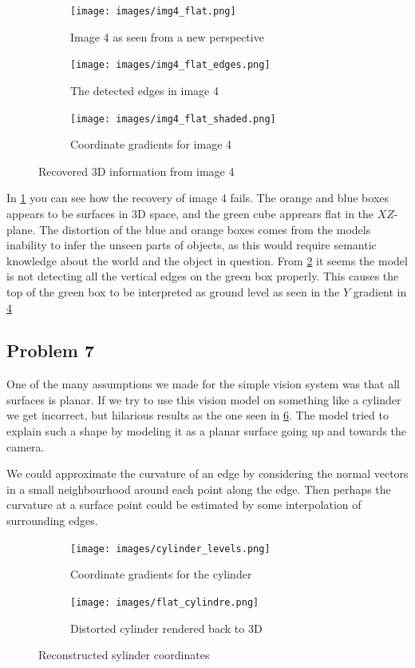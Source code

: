 \documentclass{article}
\begin{document}
\begin{figure}[ht!]
	\centering
	\begin{subfigure}{0.6\linewidth}
		\texttt{[image: images/img4\_flat.png]}
		\caption{Image 4 as seen from a new perspective}
			\label{fig:p6_figa}
	\end{subfigure}
	\begin{subfigure}{0.6\linewidth}
		\texttt{[image: images/img4\_flat\_edges.png]}
		\caption{The detected edges in image 4}
			\label{fig:p6_figb}
	\end{subfigure}
	\begin{subfigure}{0.6\linewidth}
		\texttt{[image: images/img4\_flat\_shaded.png]}
		\caption{Coordinate gradients for image 4}
			\label{fig:p6_figc}
	\end{subfigure}
	\caption{Recovered 3D information from image 4}
\end{figure}

In \cref{fig:p6_figa} you can see how the recovery of image 4 fails. The orange and blue boxes appears to be surfaces in 3D space, and the green cube apprears flat in the $XZ$-plane. The distortion of the blue and orange boxes comes from the models inability to infer the unseen parts of objects, as this would require semantic knowledge about the world and the object in question. From \cref{fig:p6_figb} it seems the model is not detecting all the vertical edges on the green box properly. This causes the top of the green box to be interpreted as ground level as seen in the $Y$ gradient in \cref{fig:p6_figc}


\subsection*{Problem 7}

One of the many assumptions we made for the simple vision system was that all surfaces is planar. If we try to use this vision model on something like a cylinder we get incorrect, but hilarious results as the one seen in \cref{fig:dist_cylinder}. The model tried to explain such a shape by modeling it as a planar surface going up and towards the camera. 

We could approximate the curvature of an edge by considering the normal vectors in a small neighbourhood around each point along the edge. Then perhaps the curvature at a surface point could be estimated by some interpolation of surrounding edges. 

\begin{figure}[h!]
	\centering
	\begin{subfigure}{0.4\linewidth}
		\texttt{[image: images/cylinder\_levels.png]}
		\caption{Coordinate gradients for the cylinder}
	\end{subfigure}
	\begin{subfigure}{0.4\linewidth}
		\texttt{[image: images/flat\_cylindre.png]}
		\caption{Distorted cylinder rendered back to 3D}
		\label{fig:dist_cylinder}
	\end{subfigure}
	\caption{Reconstructed sylinder coordinates}
\end{figure}
\end{document}
